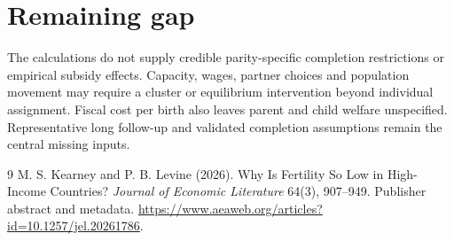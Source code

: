 \documentclass[11pt]{article}
\theoremstyle{remark}
\begin{document}
\section*{Remaining gap}
The calculations do not supply credible parity-specific completion restrictions or empirical subsidy effects. Capacity, wages, partner choices and population movement may require a cluster or equilibrium intervention beyond individual assignment. Fiscal cost per birth also leaves parent and child welfare unspecified. Representative long follow-up and validated completion assumptions remain the central missing inputs.

\begin{thebibliography}{9}
 M. S. Kearney and P. B. Levine (2026). Why Is Fertility So Low in High-Income Countries? \emph{Journal of Economic Literature} 64(3), 907--949. Publisher abstract and metadata. \url{https://www.aeaweb.org/articles?id=10.1257/jel.20261786}.
\end{thebibliography}
\end{document}

